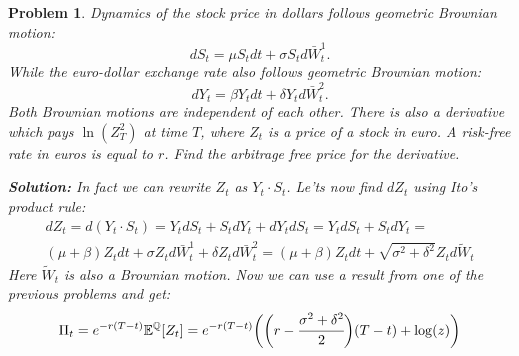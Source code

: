 \documentclass[a4paper, 12pt]{article}
\theoremstyle{problemstyle}
\newtheorem{problem}{Problem}[section]
\newenvironment{solution}
{\textit{\textbf{Solution:}}}
{}
\newcommand{\E}{\mathbb{E}}
\begin{document}
\begin{problem}
	Dynamics of the stock price in dollars follows geometric Brownian motion:
	\begin{equation}
	dS_t = \mu S_t dt + \sigma S_t d\bar{W}^1_t.
	\end{equation}
	While the euro-dollar exchange rate also follows geometric Brownian motion:
		\begin{equation}
	dY_t = \beta Y_t dt + \delta Y_t d\bar{W}^2_t.
	\end{equation}
	Both Brownian motions are independent of each other. There is also a derivative which pays $\ln(Z_T^2)$ at time $T$, where $Z_t$ is a price of a stock in euro. A risk-free rate in euros is equal to $r$.  Find the arbitrage free price for the derivative. 
	
	\begin{solution}
		In fact we can rewrite $Z_t$ as $Y_t \cdot S_t$. Le'ts now find $dZ_t$ using Ito's product rule:
		\begin{multline}
		dZ_t = d(Y_t \cdot S_t) = Y_t dS_t + S_t dY_t + dY_t dS_t =
		 Y_t dS_t + S_t dY_t  = \\
		 (\mu + \beta) Z_t dt + \sigma Z_t d\bar{W}^1_t + \delta Z_t d\bar{W}^2_t = (\mu + \beta) Z_t dt + \sqrt{\sigma^2 + \delta^2} Z_t d \tilde{W}_t
		\end{multline}
				Here $\tilde{W}_t$ is also a Brownian motion. Now we can use a result from one of the previous problems and get:
		\begin{equation}
		\Pi_t = e^{-r(T-t)}\E^{\mathbb{Q}}[Z_t] =
			e^{-r(T-t)}\bigg(\bigg(r  - \cfrac{\sigma^2 + \delta^2}{2}\bigg)(T-t) +\log(z)\bigg) 
		\end{equation}
	\end{solution}
	
\end{problem}
\end{document}
